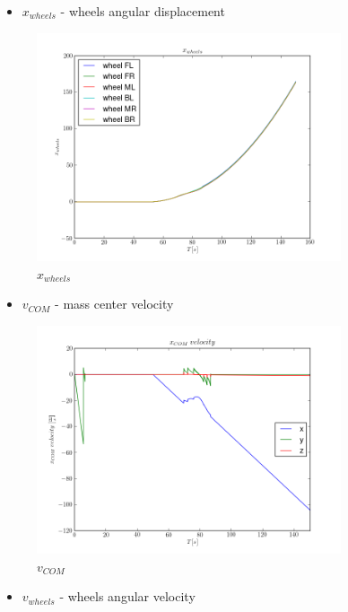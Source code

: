 \begin{itemize}
  \item $x_{wheels}$ - wheels angular displacement 
\end{itemize}

\begin{figure}[H]
  \centering
    \includegraphics[width=0.8\textwidth]{xWHEELS6}
  \caption{$x_{wheels}$}
\end{figure}

\begin{itemize}
  \item $v_{COM}$ - mass center velocity
\end{itemize}

\begin{figure}[H]
  \centering
    \includegraphics[width=0.8\textwidth]{vCOM6}
  \caption{$v_{COM}$}
\end{figure}

\begin{itemize}
  \item $v_{wheels}$ - wheels angular velocity
\end{itemize}

